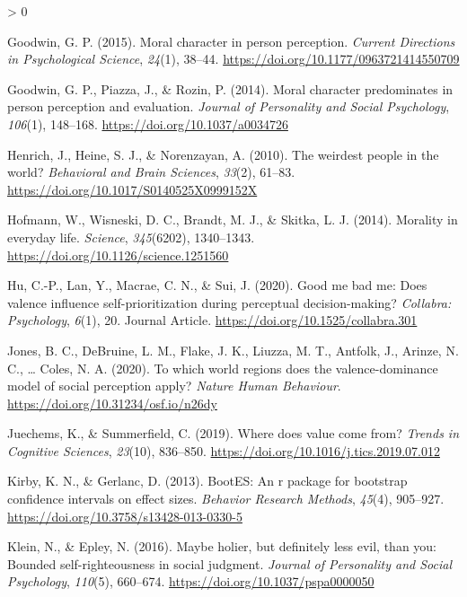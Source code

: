 \documentclass[
  english,
  man]{apa6}
\newlength{\cslhangindent}
\newenvironment{CSLReferences}[2] %
 {%
  \setlength{\parindent}{0pt}
  \ifodd #1 \everypar{\setlength{\hangindent}{\cslhangindent}}\ignorespaces\fi
  \ifnum #2 > 0
  \setlength{\parskip}{#2\baselineskip}
  \fi
 }%
 {}
\begin{document}
\begin{CSLReferences}{1}{0}
\leavevmode\hypertarget{ref-goodwin_moral_2015}{}%
Goodwin, G. P. (2015). Moral character in person perception. \emph{Current Directions in Psychological Science}, \emph{24}(1), 38--44. \url{https://doi.org/10.1177/0963721414550709}

\leavevmode\hypertarget{ref-goodwin_moral_2014}{}%
Goodwin, G. P., Piazza, J., \& Rozin, P. (2014). Moral character predominates in person perception and evaluation. \emph{Journal of Personality and Social Psychology}, \emph{106}(1), 148--168. \url{https://doi.org/10.1037/a0034726}

\leavevmode\hypertarget{ref-henrich_weirdest_2010}{}%
Henrich, J., Heine, S. J., \& Norenzayan, A. (2010). The weirdest people in the world? \emph{Behavioral and Brain Sciences}, \emph{33}(2), 61--83. \url{https://doi.org/10.1017/S0140525X0999152X}

\leavevmode\hypertarget{ref-hofmann_morality_2014}{}%
Hofmann, W., Wisneski, D. C., Brandt, M. J., \& Skitka, L. J. (2014). Morality in everyday life. \emph{Science}, \emph{345}(6202), 1340--1343. \url{https://doi.org/10.1126/science.1251560}

\leavevmode\hypertarget{ref-Hu_2020_GoodSelf}{}%
Hu, C.-P., Lan, Y., Macrae, C. N., \& Sui, J. (2020). Good me bad me: Does valence influence self-prioritization during perceptual decision-making? \emph{Collabra: Psychology}, \emph{6}(1), 20. Journal Article. \url{https://doi.org/10.1525/collabra.301}

\leavevmode\hypertarget{ref-jones_which_2020}{}%
Jones, B. C., DeBruine, L. M., Flake, J. K., Liuzza, M. T., Antfolk, J., Arinze, N. C., \ldots{} Coles, N. A. (2020). To which world regions does the valence-dominance model of social perception apply? \emph{Nature Human Behaviour}. \url{https://doi.org/10.31234/osf.io/n26dy}

\leavevmode\hypertarget{ref-juechems_where_2019}{}%
Juechems, K., \& Summerfield, C. (2019). Where does value come from? \emph{Trends in Cognitive Sciences}, \emph{23}(10), 836--850. \url{https://doi.org/10.1016/j.tics.2019.07.012}

\leavevmode\hypertarget{ref-kirby_bootes_2013}{}%
Kirby, K. N., \& Gerlanc, D. (2013). {BootES}: An r package for bootstrap confidence intervals on effect sizes. \emph{Behavior Research Methods}, \emph{45}(4), 905--927. \url{https://doi.org/10.3758/s13428-013-0330-5}

\leavevmode\hypertarget{ref-klein_maybe_2016}{}%
Klein, N., \& Epley, N. (2016). Maybe holier, but definitely less evil, than you: Bounded self-righteousness in social judgment. \emph{Journal of Personality and Social Psychology}, \emph{110}(5), 660--674. \url{https://doi.org/10.1037/pspa0000050}


\end{CSLReferences}
\end{document}
